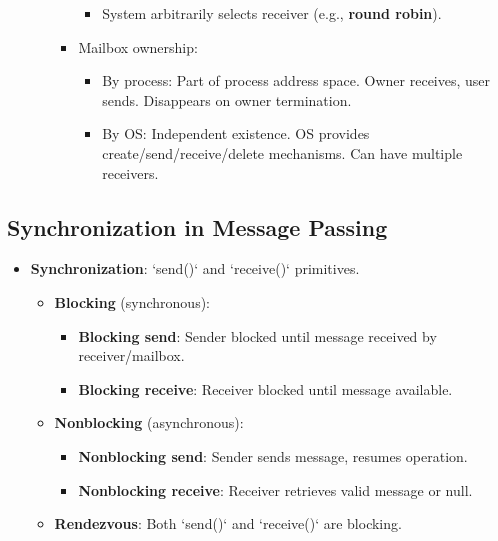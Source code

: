 \begin{itemize}
\begin{itemize}
\begin{itemize}
\begin{itemize}
                            \item System arbitrarily selects receiver (e.g., \textbf{round robin}).
                        \end{itemize}
                    \item Mailbox ownership:
                        \begin{itemize}
                            \item By process: Part of process address space. Owner receives, user sends. Disappears on owner termination.
                            \item By OS: Independent existence. OS provides create/send/receive/delete mechanisms. Can have multiple receivers.
                        \end{itemize}
                \end{itemize}
        \end{itemize}
\end{itemize}

\subsection{Synchronization in Message Passing}
\begin{itemize}
    \item \textbf{Synchronization}: `send()` and `receive()` primitives.
        \begin{itemize}
            \item \textbf{Blocking} (synchronous):
                \begin{itemize}
                    \item \textbf{Blocking send}: Sender blocked until message received by receiver/mailbox.
                    \item \textbf{Blocking receive}: Receiver blocked until message available.
                \end{itemize}
            \item \textbf{Nonblocking} (asynchronous):
                \begin{itemize}
                    \item \textbf{Nonblocking send}: Sender sends message, resumes operation.
                    \item \textbf{Nonblocking receive}: Receiver retrieves valid message or null.
                \end{itemize}
            \item \textbf{Rendezvous}: Both `send()` and `receive()` are blocking.
        \end{itemize}
\end{itemize}

